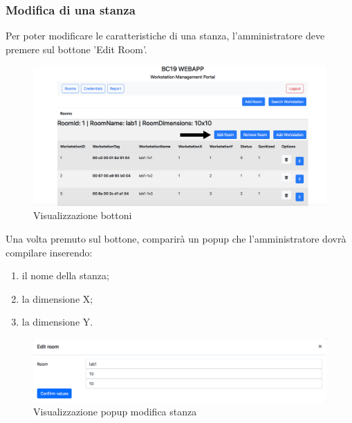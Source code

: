 \subsubsection{Modifica di una stanza}
Per poter modificare le caratteristiche di una stanza, l'amministratore deve premere sul bottone 'Edit Room'.
\begin{figure}[H]
	\centering
	\includegraphics[width=15cm]{res/images/bottoneEditRoom.png}
	\caption{Visualizzazione bottoni}
\end{figure}
Una volta premuto sul bottone, comparirà un popup che l'amministratore dovrà compilare inserendo:
\begin{enumerate}
\item il nome della stanza;
\item la dimensione X;
\item la dimensione Y.
\end{enumerate}
\begin{figure}[H]
	\centering
	\includegraphics[width=15cm]{res/images/modificaStanza.png}
	\caption{Visualizzazione popup modifica stanza}
\end{figure}

